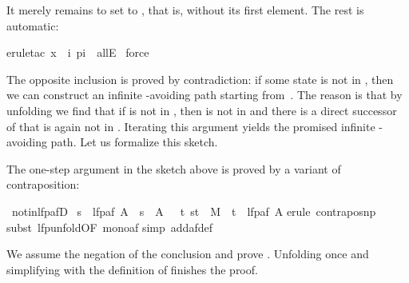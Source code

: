 \begin{isabellebody}
\begin{isamarkuptxt}
\begin{isabelle}
\end{isabelle}
It merely remains to set  to , that is, 
 without its first element.  The rest is automatic:%
\end{isamarkuptxt}%
\isamarkuptrue%
erule{\isacharunderscore}tac\ x\ {\isacharequal}\ {\isachardoublequote}{\isasymlambda}i{\isachardot}\ p{\isacharparenleft}i{\isacharplus}{}{\isacharparenright}{\isachardoublequote}\ \ allE{\isacharparenright}\isanewline
\isamarkupfalse%
\ force\isanewline
\isamarkupfalse%
\isamarkupfalse%
%
\begin{isamarkuptext}%
The opposite inclusion is proved by contradiction: if some state
 is not in , then we can construct an
infinite -avoiding path starting from~. The reason is
that by unfolding  we find that if  is not in
, then  is not in  and there is a
direct successor of  that is again not in \mbox{}. Iterating this argument yields the promised infinite
-avoiding path. Let us formalize this sketch.

The one-step argument in the sketch above
is proved by a variant of contraposition:%
\end{isamarkuptext}%
\isamarkuptrue%
\ not{\isacharunderscore}in{\isacharunderscore}lfp{\isacharunderscore}afD{\isacharcolon}\isanewline
\ {\isachardoublequote}s\ {\isasymnotin}\ lfp{\isacharparenleft}af\ A{\isacharparenright}\ {\isasymLongrightarrow}\ s\ {\isasymnotin}\ A\ {\isasymand}\ {\isacharparenleft}{\isasymexists}\ t{\isachardot}\ {\isacharparenleft}s{\isacharcomma}t{\isacharparenright}\ {\isasymin}\ M\ {\isasymand}\ t\ {\isasymnotin}\ lfp{\isacharparenleft}af\ A{\isacharparenright}{\isacharparenright}{\isachardoublequote}\isanewline
\isamarkupfalse%
erule\ contrapos{\isacharunderscore}np{\isacharparenright}\isanewline
\isamarkupfalse%
subst\ lfp{\isacharunderscore}unfold{\isacharbrackleft}OF\ mono{\isacharunderscore}af{\isacharbrackright}{\isacharparenright}\isanewline
\isamarkupfalse%
simp\ add{\isacharcolon}af{\isacharunderscore}def{\isacharparenright}\isanewline
\isamarkupfalse%
\isamarkupfalse%
%
\begin{isamarkuptext}%
\noindent
We assume the negation of the conclusion and prove .
Unfolding  once and
simplifying with the definition of  finishes the proof.


\end{isamarkuptext}
\end{isabellebody}
